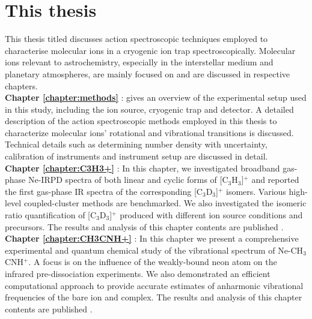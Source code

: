 \section{This thesis}

This thesis titled  discusses action spectroscopic techniques employed to characterise molecular ions in a cryogenic ion trap spectroscopically. Molecular ions relevant to astrochemistry, especially in the interstellar medium and planetary atmospheres, are mainly focused on and are discussed in respective chapters.\\

\textbf{Chapter \ref{chapter:methods}} \emph{}:  gives an overview of the experimental setup used in this study, including the ion source, cryogenic trap and detector. A detailed description of the action spectroscopic methods employed in this thesis to characterize molecular ions' rotational and vibrational transitions is discussed. Technical details such as determining number density with uncertainty, calibration of instruments and instrument setup are discussed in detail.\\

\textbf{Chapter \ref{chapter:C3H3+}} \emph{}: In this chapter, we investigated broadband gas-phase Ne-IRPD spectra of both linear and cyclic forms of [C$_3$H$_3$]$^+$ and reported the first gas-phase IR spectra of the corresponding [C$_3$D$_3$]$^+$ isomers. Various high-level coupled-cluster methods are benchmarked. We also investigated the isomeric ratio quantification of [C$_3$D$_3$]$^+$ produced with different ion source conditions and precursors. 
The results and analysis of this chapter contents are published \cite{Marimuthu2020LaboratorySpectroscopy}.\\

\textbf{Chapter \ref{chapter:CH3CNH+}} \emph{}: In this chapter we present a comprehensive experimental and quantum chemical study of the vibrational spectrum of Ne-CH$_3$CNH$^+$. A focus is on the influence of the weakly-bound neon atom on the infrared pre-dissociation experiments. We also demonstrated an efficient computational approach to provide accurate estimates of anharmonic vibrational frequencies of the bare ion and complex. The results and analysis of this chapter contents are published \cite{Marimuthu2021InfraredCH3CNH+}.\\

